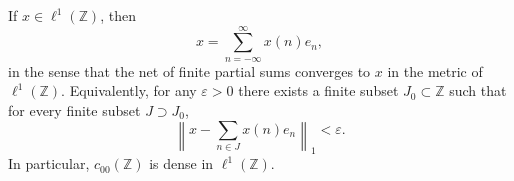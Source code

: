 If $x \in \ell^1(\mathbb{Z})$, then
$$x = \sum_{n=-\infty}^{\infty} x(n) e_n,$$
in the sense that the net of finite partial sums converges to $x$ in the metric of $\ell^1(\mathbb{Z})$. Equivalently, for any $\varepsilon > 0$ there exists a finite subset $J_0 \subset \mathbb{Z}$ such that for every finite subset $J \supset J_0$,
$$\left\| x - \sum_{n \in J} x(n) e_n \right\|_1 < \varepsilon.$$
In particular, $c_{00}(\mathbb{Z})$ is dense in $\ell^1(\mathbb{Z})$.
